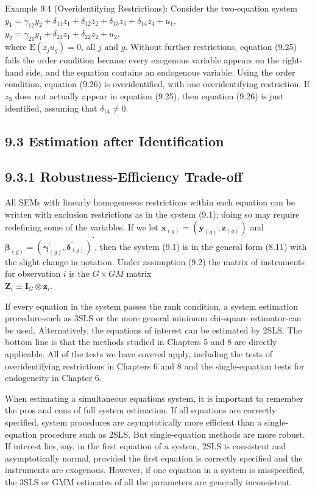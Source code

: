 \documentclass[10pt]{article}
\begin{document}
Example 9.4 (Overidentifying Restrictions): Consider the two-equation system\\
$y_{1}=\gamma_{12} y_{2}+\delta_{11} z_{1}+\delta_{12} z_{2}+\delta_{13} z_{3}+\delta_{14} z_{4}+u_{1}$,\\
$y_{2}=\gamma_{21} y_{1}+\delta_{21} z_{1}+\delta_{22} z_{2}+u_{2}$,\\
where $\mathrm{E}\left(z_{j} u_{g}\right)=0$, all $j$ and $g$. Without further restrictions, equation (9.25) fails the order condition because every exogenous variable appears on the right-hand side, and the equation contains an endogenous variable. Using the order condition, equation (9.26) is overidentified, with one overidentifying restriction. If $z_{3}$ does not actually appear in equation (9.25), then equation (9.26) is just identified, assuming that $\delta_{14} \neq 0$.

\subsection*{9.3 Estimation after Identification}
\subsection*{9.3.1 Robustness-Efficiency Trade-off}
All SEMs with linearly homogeneous restrictions within each equation can be written with exclusion restrictions as in the system (9.1); doing so may require redefining some of the variables. If we let $\mathbf{x}_{(g)}=\left(\mathbf{y}_{(g)}, \mathbf{z}_{(g)}\right)$ and $\boldsymbol{\beta}_{(g)}=\left(\boldsymbol{\gamma}_{(g)}^{\prime}, \boldsymbol{\delta}_{(g)}^{\prime}\right)^{\prime}$, then the system (9.1) is in the general form (8.11) with the slight change in notation. Under assumption (9.2) the matrix of instruments for observation $i$ is the $G \times G M$ matrix\\
$\mathbf{Z}_{i} \equiv \mathbf{I}_{G} \otimes \mathbf{z}_{i}$.

If every equation in the system passes the rank condition, a system estimation procedure-such as 3SLS or the more general minimum chi-square estimator-can be used. Alternatively, the equations of interest can be estimated by 2SLS. The bottom line is that the methods studied in Chapters 5 and 8 are directly applicable. All of the tests we have covered apply, including the tests of overidentifying restrictions in Chapters 6 and 8 and the single-equation tests for endogeneity in Chapter 6.

When estimating a simultaneous equations system, it is important to remember the pros and cons of full system estimation. If all equations are correctly specified, system procedures are asymptotically more efficient than a single-equation procedure such as 2SLS. But single-equation methods are more robust. If interest lies, say, in the first equation of a system, 2SLS is consistent and asymptotically normal, provided the first equation is correctly specified and the instruments are exogenous. However, if one equation in a system is misspecified, the 3SLS or GMM estimates of all the parameters are generally inconsistent.
\end{document}
